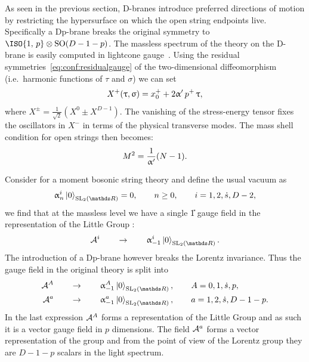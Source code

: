 As seen in the previous section, D-branes introduce preferred directions of motion by restricting the hypersurface on which the open string endpoints live.
Specifically a Dp-brane breaks the original  symmetry to $\ISO{1,\, p} \otimes \SO{D - 1 - p}$.\footnotemark{}
The massless spectrum of the theory on the D-brane is easily computed in lightcone gauge~\cite{Goddard:1973:QuantumDynamicsMassless,Angelantonj:2002:OpenStrings}.
Using the residual symmetries~\eqref{eq:conf:residualgauge} of the two-dimensional diffeomorphism (i.e.\ harmonic functions of $\tau$ and $\sigma$) we can set
\begin{equation}
  X^+\qty( \uptau, \upsigma ) = x_0^+ + 2 \upalpha'\, p^+\, \uptau,
\end{equation}
where $X^{\pm} = \frac{1}{\sqrt{2}} (X^0 \pm X^{D-1})$.
The vanishing of the stress-energy tensor fixes the oscillators in $X^-$ in terms of the physical transverse modes.
The mass shell condition for open strings then becomes:\footnotemark{}
\begin{equation}
  M^2 = \frac{1}{\upalpha'} \qty( N - 1 ).
\end{equation}

Consider for a moment bosonic string theory and define the usual vacuum as
\begin{equation}
  \alpha_n^i \regvacuum = 0,
  \qquad
  n \ge 0,
  \qquad
  i = 1, 2, \dots, D - 2,
\end{equation}
we find that at the massless level we have a single \U{1} gauge field in the representation of the Little Group :
\begin{equation}
  \cA^i
  \qquad
  \rightarrow
  \qquad
  \alpha_{-1}^i \regvacuum.
\end{equation}
The introduction of a Dp-brane however breaks the Lorentz invariance.
Thus the gauge field in the original theory is split into
\begin{equation}
  \begin{split}
    \cA^A
    \qquad
    & \rightarrow
    \qquad
    \alpha_{-1}^A \regvacuum,
    \qquad
    A = 0, 1, \dots, p,
    \\
    \cA^a
    \qquad
    & \rightarrow
    \qquad
    \alpha_{-1}^a \regvacuum,
    \qquad
    a = 1, 2, \dots, D - 1 -p.
  \end{split}
\end{equation}
In the last expression $\mathcal{A}^A$ forms a representation of the Little Group  and as such it is a vector gauge field in $p$ dimensions.
The field $\mathcal{A}^a$ forms a vector representation of the group  and from the point of view of the Lorentz group they are $D - 1 - p$ scalars in the light spectrum.

